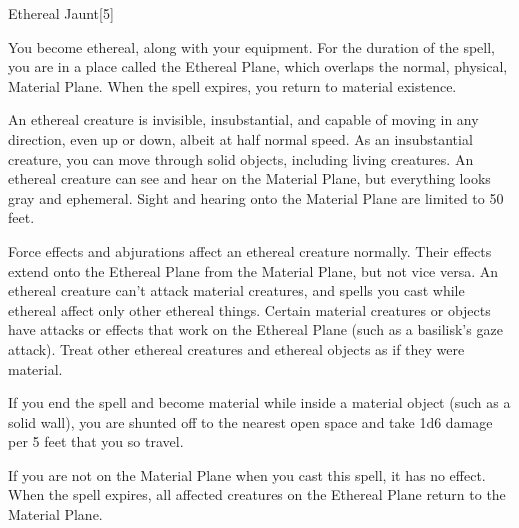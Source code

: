 \begin{spellsection}{Ethereal Jaunt}[5]
    \begin{spellheader}
    \end{spellheader}
    \begin{spellcontent}
        \begin{spelltargetinginfo}
        \end{spelltargetinginfo}
        \begin{spelleffects}
            \spelleffect You become ethereal, along with your equipment. For the duration of the spell, you are in a place called the Ethereal Plane, which overlaps the normal, physical, Material Plane. When the spell expires, you return to material existence.
            \par An ethereal creature is invisible, insubstantial, and capable of moving in any direction, even up or down, albeit at half normal speed. As an insubstantial creature, you can move through solid objects, including living creatures. An ethereal creature can see and hear on the Material Plane, but everything looks gray and ephemeral. Sight and hearing onto the Material Plane are limited to 50 feet.
            \par Force effects and abjurations affect an ethereal creature normally. Their effects extend onto the Ethereal Plane from the Material Plane, but not vice versa. An ethereal creature can't attack material creatures, and spells you cast while ethereal affect only other ethereal things. Certain material creatures or objects have attacks or effects that work on the Ethereal Plane (such as a basilisk's gaze attack). Treat other ethereal creatures and ethereal objects as if they were material.
            \par If you end the spell and become material while inside a material object (such as a solid wall), you are shunted off to the nearest open space and take 1d6 damage per 5 feet that you so travel.
            \spelldur \durshort \dismissable
        \end{spelleffects}
    \end{spellcontent}
    \begin{spellfooter}
        \spellnotes If you are not on the Material Plane when you cast this spell, it has no effect. When the spell expires, all affected creatures on the Ethereal Plane return to the Material Plane.
        \miscastexplode
    \end{spellfooter}
    \begin{spellaugments}
    \end{spellaugments}
\end{spellsection}

